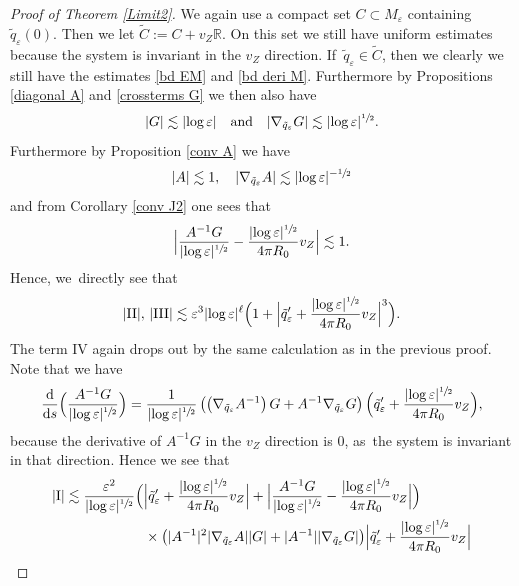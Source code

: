 \documentclass[JEP,XML,SOM,Unicode,published]{cedram}
\let\epsilon\varepsilon
\newcommand{\rI}{\mathrm{I}}
\newcommand{\rII}{\mathrm{II}}
\newcommand{\rIII}{\mathrm{III}}
\newcommand{\rIV}{\mathrm{IV}}
\theoremstyle{definition}
\newcommand\R{\mathbb{R}}
\newcommand\eq{=}
\let\eps\epsilon
\begin{document}
\begin{proof}[Proof of Theorem \ref{Limit2}]
We again use a compact set $C\subset M_\eps$ containing $\tilde{q}_\eps(0)$. Then we let $\tilde{C}:=C+v_Z\R$. On this set we still have uniform estimates because the system is invariant in the $v_Z$ direction. If~$\tilde{q}_\eps\in \tilde{C}$, then we clearly we still have the estimates \eqref{bd EM} and \eqref{bd deri M}. Furthermore by Propositions \ref{diagonal A} and \ref{crossterms G} we then also have
\begin{align*}
|G|\lesssim |{\log\eps}|
\quad\text{and}\quad
|\nabla_{\tilde{q}_\eps}G|\lesssim |{\log\eps}|^{\sfrac{1}{2}}.
\end{align*}
Furthermore by Proposition \ref{conv A} we have
\begin{align*}
|A|\lesssim 1,\quad |\nabla_{\tilde{q}_\eps}A|\lesssim |{\log\eps}|^{-\sfrac{1}{2}}
\end{align*}
and from Corollary \ref{conv J2} one sees that
\begin{align*}
\Bigl|\frac{A^{-1}G}{|{\log\eps}|^{\sfrac{1}{2}}}-\frac{|{\log\eps}|^{\sfrac{1}{2}}}{4\pi R_0}v_Z \Bigr|\lesssim 1.
\end{align*}
Hence, we~directly see that
\begin{align*}
|\rII|,\,|\rIII|\lesssim \eps^3|{\log\eps}|^\ell \Bigl(1+ \Bigl|\tilde{q}_\eps'+\frac{|{\log\eps}|^{\sfrac{1}{2}}}{4\pi R_0}v_Z \Bigr|^3 \Bigr).
\end{align*}
The term $\rIV$ again drops out by the same calculation as in the previous proof. Note that we have
\begin{align*}
\frac{\text{d}}{\text{d}s} \Bigl(\frac{A^{-1}G}{|{\log\eps}|^{\sfrac{1}{2}}} \Bigr)\eq\frac{1}{|{\log\eps}|^{\sfrac{1}{2}}}\left(\left(\nabla_{\tilde{q}_\eps}A^{-1}\right)G+A^{-1}\nabla_{\tilde{q}_\eps}G\right) \Bigl(\tilde{q}_\eps'+\frac{|{\log\eps}|^{\sfrac{1}{2}}}{4\pi R_0}v_Z \Bigr),
\end{align*}
because the derivative of $A^{-1}G$ in the $v_Z$ direction is $0$, as~the system is invariant in that direction.
Hence we see that
\begin{align*}
|\rI|&\lesssim\frac{\eps^2}{|{\log\eps}|^{\sfrac{1}{2}}} \Bigl(\Bigl|\tilde{q}_\eps'+\frac{|{\log\eps}|^{\sfrac{1}{2}}}{4\pi R_0}v_Z \Bigr|+ \Bigl|\frac{A^{-1}G}{|{\log\eps}|^{\sfrac{1}{2}}}-\frac{|{\log\eps}|^{\sfrac{1}{2}}}{4\pi R_0}v_Z \Bigr| \Bigr)\\
&\hspace*{2cm}\times\left(|A^{-1}|^2|\nabla_{\tilde{q}_\eps}A||G|+|A^{-1}||\nabla_{\tilde{q}_\eps}G|\right) \Bigr|\tilde{q}_\eps'+\frac{|{\log\eps}|^{\sfrac{1}{2}}}{4\pi R_0}v_Z \Bigr|\\

\end{align*}
\end{proof}
\end{document}

